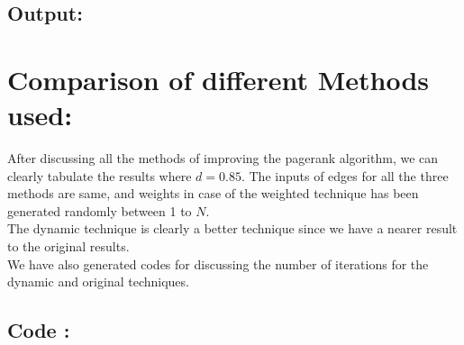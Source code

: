 \documentclass[10pt,a4paper]{article}
\begin{document}
\subsection*{Output: }

\lstset{style=mystyle}



\newpage
\section{Comparison of different Methods used:}
After discussing all the methods of improving the pagerank algorithm, we can clearly tabulate the results where $d=0.85$. The inputs of edges for all the three methods are same, and weights in case of the weighted technique has been generated randomly between 1 to $N$.\\
The dynamic technique is clearly a better technique since we have a nearer result to the original results.\\ We have also generated codes for discussing the number of iterations for the dynamic and original techniques.
\subsection*{Code :}
\lstset{style=mystyle}

\newpage
\lstset{style=mystyle}

\newpage

\end{document}
